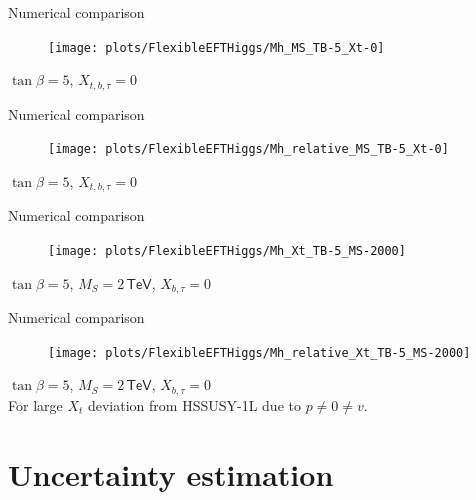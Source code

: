 \documentclass[hyperref={pdfpagelabels=false},ngerman]{beamer}
\newcommand{\eh}[1]{\,\mathsf{#1}}
\begin{document}
\begin{frame}{Numerical comparison}
  \begin{figure}
    \centering
    \texttt{[image: plots/FlexibleEFTHiggs/Mh\_MS\_TB-5\_Xt-0]}
  \end{figure}
  $\tan\beta = 5$, $X_{t,b,\tau} = 0$
\end{frame}

\begin{frame}{Numerical comparison}
  \begin{figure}
    \centering
    \texttt{[image: plots/FlexibleEFTHiggs/Mh\_relative\_MS\_TB-5\_Xt-0]}
  \end{figure}
  $\tan\beta = 5$, $X_{t,b,\tau} = 0$
\end{frame}

\begin{frame}{Numerical comparison}
  \begin{figure}
    \centering
    \texttt{[image: plots/FlexibleEFTHiggs/Mh\_Xt\_TB-5\_MS-2000]}
  \end{figure}
  $\tan\beta = 5$, $M_S = 2 \eh{TeV}$, $X_{b,\tau} = 0$
\end{frame}

\begin{frame}{Numerical comparison}
  \begin{figure}
    \centering
    \texttt{[image: plots/FlexibleEFTHiggs/Mh\_relative\_Xt\_TB-5\_MS-2000]}
  \end{figure}
  $\tan\beta = 5$, $M_S = 2 \eh{TeV}$, $X_{b,\tau} = 0$\\
  For large $X_t$ deviation from HSSUSY-1L due to $p\neq 0 \neq v$.
\end{frame}


\section{Uncertainty estimation}
\end{document}
